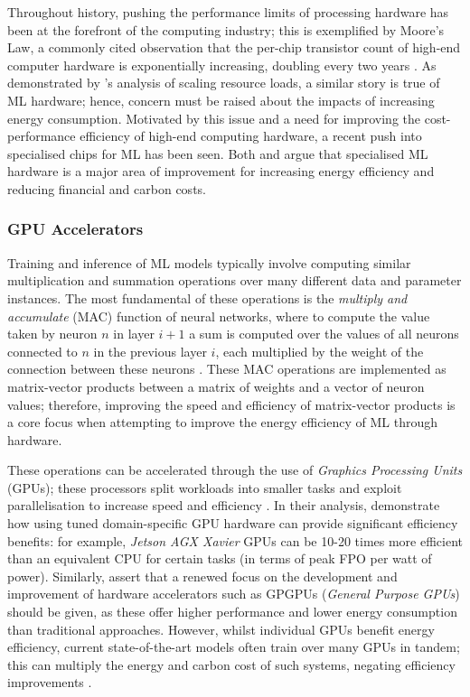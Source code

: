 \documentclass[a4paper, 12pt]{article}
\begin{document}
    Throughout history, pushing the performance limits of processing hardware has been at the forefront of the computing industry; this is exemplified by Moore's Law, a commonly cited observation that the per-chip transistor count of high-end computer hardware is exponentially increasing, doubling every two years \cite{amodei-hernandez-2021}. As demonstrated by 's analysis of scaling resource loads, a similar story is true of ML hardware; hence, concern must be raised about the impacts of increasing energy consumption. Motivated by this issue and a need for improving the cost-performance efficiency of high-end computing hardware, a recent push into specialised chips for ML has been seen. Both  and  argue that specialised ML hardware is a major area of improvement for increasing energy efficiency and reducing financial and carbon costs.

    \subsubsection{GPU Accelerators}

    Training and inference of ML models typically involve computing similar multiplication and summation operations over many different data and parameter instances. The most fundamental of these operations is the \emph{multiply and accumulate} (MAC) function of neural networks, where to compute the value taken by neuron $n$ in layer $i+1$ a sum is computed over the values of all neurons connected to $n$ in the previous layer $i$, each multiplied by the weight of the connection between these neurons \cite{burr-2021}. These MAC operations are implemented as matrix-vector products between a matrix of weights and a vector of neuron values; therefore, improving the speed and efficiency of matrix-vector products is a core focus when attempting to improve the energy efficiency of ML through hardware. 

    These operations can be accelerated through the use of \emph{Graphics Processing Units} (GPUs); these processors split workloads into smaller tasks and exploit parallelisation to increase speed and efficiency \cite{kumar-2020}. In their analysis,  demonstrate how using tuned domain-specific GPU hardware can provide significant efficiency benefits: for example, \emph{Jetson AGX Xavier} GPUs \cite{seznec-2021} can be 10-20 times more efficient than an equivalent CPU for certain tasks (in terms of peak FPO per watt of power). Similarly,  assert that a renewed focus on the development and improvement of hardware accelerators such as GPGPUs (\emph{General Purpose GPUs}) should be given, as these offer higher performance and lower energy consumption than traditional approaches. However, whilst individual GPUs benefit energy efficiency, current state-of-the-art models often train over many GPUs in tandem; this can multiply the energy and carbon cost of such systems, negating efficiency improvements \cite{leeuw-2021}.
\end{document}
